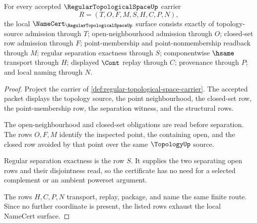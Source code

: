 \begin{theorem}
\label{thm:regular-topological-space-namecert-obligations}
For every accepted $\RegularTopologicalSpaceUp$ carrier
$$
R=(T,O,F,M,S,H,C,P,N),
$$
the local $\NameCert_{\RegularTopologicalSpaceUp}$ surface consists exactly of topology-source admission through $T$; open-neighbourhood admission through $O$; closed-set row admission through $F$; point-membership and point-nonmembership readback through $M$; regular separation exactness through $S$; componentwise $\hsame$ transport through $H$; displayed $\Cont$ replay through $C$; provenance through $P$; and local naming through $N$.
\end{theorem}
\begin{proof}
Project the carrier of \autoref{def:regular-topological-space-carrier}. The accepted packet displays the topology source, the point neighbourhood, the closed-set row, the point-membership row, the separation witness, and the structural rows.

The open-neighbourhood and closed-set obligations are read before separation. The rows $O,F,M$ identify the inspected point, the containing open, and the closed row avoided by that point over the same $\TopologyUp$ source.

Regular separation exactness is the row $S$. It supplies the two separating open rows and their disjointness read, so the certificate has no need for a selected complement or an ambient powerset argument.

The rows $H,C,P,N$ transport, replay, package, and name the same finite route. Since no further coordinate is present, the listed rows exhaust the local NameCert surface.
\end{proof}

